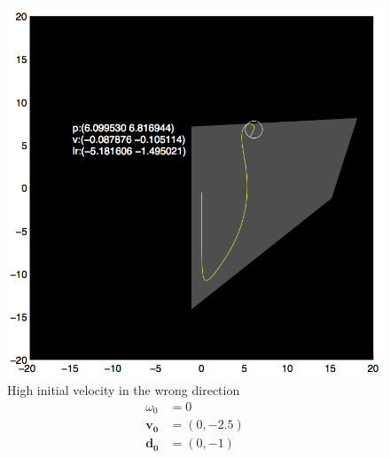 \documentclass{report}
\begin{document}
\begin{figure}
\begin{minipage}[t]{0.45\linewidth}
    \centering
    
    \includegraphics[width=\linewidth]{fig3.png}
    \captionsetup{singlelinecheck=off}
    \caption[.]{\label{fig:fig3}High initial velocity in the wrong direction\begin{align*}
    \omega_0 &= 0 \\
    \mathbf{v_0} &= (0, -2.5)\\
    \mathbf{d_0} &= (0, -1)
    \end{align*}
    }
\end{minipage}
\hfill
\begin{minipage}[t]{0.45\linewidth}
    \centering
    

\end{minipage}
\end{figure}
\end{document}
